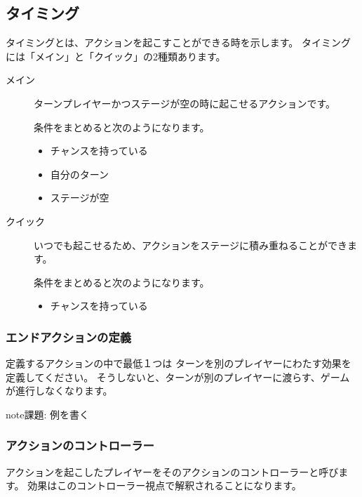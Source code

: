 \documentclass[letterpaper,10pt,dvipdfmx]{sphinxmanual}
\begin{document}
\subsection{タイミング}
\label{\detokenize{core/core:id8}}
タイミングとは、アクションを起こすことができる時を示します。
タイミングには「メイン」と「クイック」の2種類あります。
\begin{description}
\item[{メイン}] \leavevmode
ターンプレイヤーかつステージが空の時に起こせるアクションです。

条件をまとめると次のようになります。
\begin{itemize}
\item {} 
チャンスを持っている

\item {} 
自分のターン

\item {} 
ステージが空

\end{itemize}

\item[{クイック}] \leavevmode
いつでも起こせるため、アクションをステージに積み重ねることができます。

条件をまとめると次のようになります。
\begin{itemize}
\item {} 
チャンスを持っている

\end{itemize}

\end{description}


\subsubsection{エンドアクションの定義}
\label{\detokenize{core/core:id9}}
定義するアクションの中で最低１つは
ターンを別のプレイヤーにわたす効果を定義してください。
そうしないと、ターンが別のプレイヤーに渡らす、ゲームが進行しなくなります。

\begin{sphinxadmonition}{note}{\label{\detokenize{core/core:id10}}課題:}
例を書く
\end{sphinxadmonition}


\subsubsection{アクションのコントローラー}
\label{\detokenize{core/core:id11}}
アクションを起こしたプレイヤーをそのアクションのコントローラーと呼びます。
効果はこのコントローラー視点で解釈されることになります。
\end{document}
